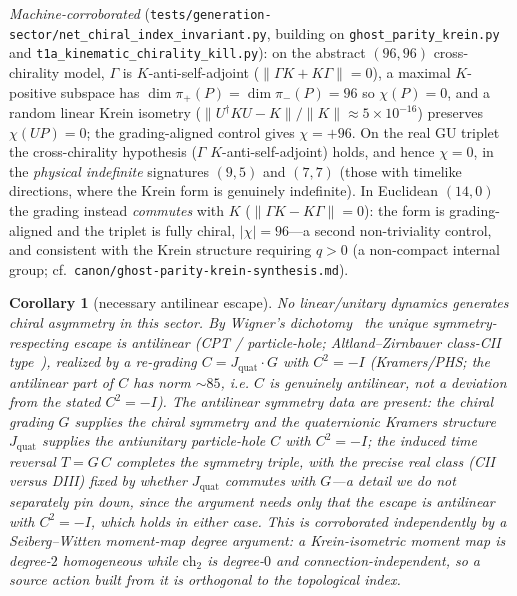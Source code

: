 \documentclass[11pt]{article}
\newtheorem{corollary}{Corollary}
\theoremstyle{definition}
\theoremstyle{remark}
\newcommand{\ch}{\mathrm{ch}}
\newcommand{\Jq}{J_{\mathrm{quat}}}
\begin{document}
\noindent\emph{Machine-corroborated} (\texttt{tests/generation-sector/net\_chiral\_index\_invariant.py}, building
on \texttt{ghost\_parity\_krein.py} and \texttt{t1a\_kinematic\_chirality\_kill.py}): on the abstract $(96,96)$
cross-chirality model, $\Gamma$ is $K$-anti-self-adjoint ($\|\Gamma K+K\Gamma\|=0$), a maximal $K$-positive
subspace has $\dim\pi_+(P)=\dim\pi_-(P)=96$ so $\chi(P)=0$, and a random linear Krein isometry
($\|U^{\dagger}KU-K\|/\|K\|\approx5\times10^{-16}$) preserves $\chi(UP)=0$; the grading-aligned control gives
$\chi=+96$. On the real GU triplet the cross-chirality hypothesis ($\Gamma$ $K$-anti-self-adjoint) holds, and
hence $\chi=0$, in the \emph{physical indefinite} signatures $(9,5)$ and $(7,7)$ (those with timelike directions,
where the Krein form is genuinely indefinite). In Euclidean $(14,0)$ the grading instead \emph{commutes} with $K$
($\|\Gamma K-K\Gamma\|=0$): the form is grading-aligned and the triplet is fully chiral, $|\chi|=96$---a second
non-triviality control, and consistent with the Krein structure requiring $q>0$ (a non-compact internal group;
cf.\ \texttt{canon/ghost-parity-krein-synthesis.md}).

\begin{corollary}[necessary antilinear escape]
No linear/unitary dynamics generates chiral asymmetry in this sector. By Wigner's
dichotomy~\cite{wigner1931gruppentheorie} the unique symmetry-respecting escape is \emph{antilinear} (CPT /
particle-hole; Altland--Zirnbauer class-CII type~\cite{altland1997nonstandard}), realized by a
re-grading $C = \Jq\cdot G$ with $C^2 = -I$ (Kramers/PHS; the antilinear part of $C$ has norm $\sim 85$, i.e. $C$
is genuinely antilinear, not a deviation from the stated $C^2=-I$). The antilinear symmetry data are present: the chiral
grading $G$ supplies the chiral symmetry and the quaternionic Kramers structure $\Jq$ supplies the antiunitary
particle-hole $C$ with $C^2 = -I$; the induced time reversal $T = G\,C$ completes the symmetry triple, with the
precise real class (CII versus DIII) fixed by whether $\Jq$ commutes with $G$---a detail we do not separately pin
down, since the argument needs only that the escape is antilinear with $C^2=-I$, which holds in either case. This is corroborated independently by a
Seiberg--Witten moment-map degree argument: a Krein-isometric moment map is degree-$2$ homogeneous while $\ch_2$
is degree-$0$ and connection-independent, so a source action built from it is orthogonal to the topological index.
\end{corollary}
\end{document}
